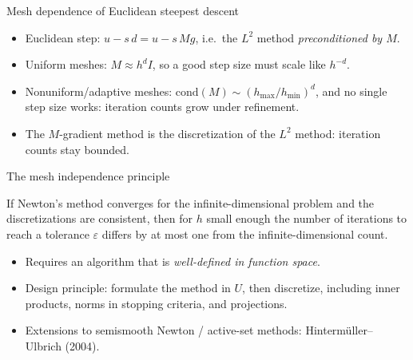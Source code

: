 \documentclass[main.tex]{subfiles}
\begin{document}
\begin{frame}{Mesh dependence of Euclidean steepest descent}
  \begin{itemize}
    \item Euclidean step: $u - s\,d = u - s\,M g$, i.e.\ the $L^2$ method \emph{preconditioned by $M$}.
    \item Uniform meshes: $M \approx h^d I$, so a good step size must scale like $h^{-d}$.
    \item Nonuniform/adaptive meshes: $\mathrm{cond}(M) \sim (h_{\max}/h_{\min})^d$, and no single step size works: iteration counts grow under refinement.
    \item The $M$-gradient method is the discretization of the $L^2$ method: iteration counts stay bounded.
  \end{itemize}
  \vspace{1ex}
\end{frame}

\begin{frame}{The mesh independence principle}
  \begin{theorem}
    If Newton's method converges for the infinite-dimensional problem and the discretizations are consistent, then for $h$ small enough the number of iterations to reach a tolerance $\varepsilon$ differs by at most one from the infinite-dimensional count.
  \end{theorem}
  \begin{itemize}
    \item Requires an algorithm that is \emph{well-defined in function space}.
    \item Design principle: \alert{formulate the method in $U$, then discretize}, including inner products, norms in stopping criteria, and projections.
    \item Extensions to semismooth Newton / active-set methods: Hinterm\"uller--Ulbrich (2004).
  \end{itemize}
\end{frame}
\end{document}

